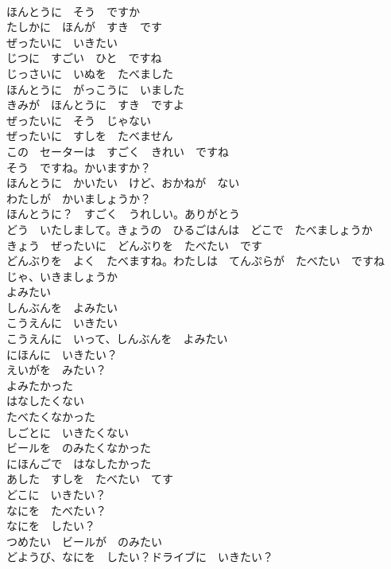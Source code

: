 \documentclass[8pt]{extreport}
\begin{document}
\begin{CJK}{UTF8}{min}
\\	ほんとうに　そう　ですか	
\\	たしかに　ほんが　すき　です	
\\	ぜったいに　いきたい	
\\	じつに　すごい　ひと　ですね	
\\	じっさいに　いぬを　たべました	
\\	ほんとうに　がっこうに　いました	
\\	きみが　ほんとうに　すき　ですよ	
\\	ぜったいに　そう　じゃない	
\\	ぜったいに　すしを　たべません	
\\	この　セーターは　すごく　きれい　ですね	
\\	そう　ですね。かいますか？	
\\	ほんとうに　かいたい　けど、おかねが　ない	
\\	わたしが　かいましょうか？	
\\	ほんとうに？　すごく　うれしい。ありがとう	
\\	どう　いたしまして。きょうの　ひるごはんは　どこで　たべましょうか	
\\	きょう　ぜったいに　どんぶりを　たべたい　です	
\\	どんぶりを　よく　たべますね。わたしは　てんぷらが　たべたい　ですね	
\\	じゃ、いきましょうか	
\\	よみたい	
\\	しんぶんを　よみたい	
\\	こうえんに　いきたい	
\\	こうえんに　いって、しんぶんを　よみたい	
\\	にほんに　いきたい？	
\\	えいがを　みたい？	
\\	よみたかった	
\\	はなしたくない	
\\	たべたくなかった	
\\	しごとに　いきたくない	
\\	ビールを　のみたくなかった	
\\	にほんごで　はなしたかった	
\\	あした　すしを　たべたい　てす	
\\	どこに　いきたい？	
\\	なにを　たべたい？	
\\	なにを　したい？	
\\	つめたい　ビールが　のみたい	
\\	どようび、なにを　したい？ドライブに　いきたい？	

\end{CJK}
\end{document}
